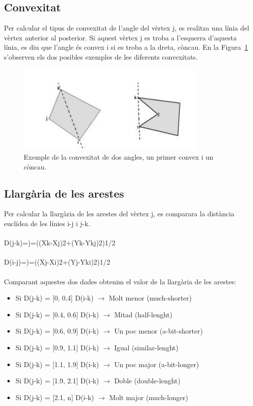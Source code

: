 \documentclass{article}
\begin{document}
\subsection{Convexitat}
Per calcular el tipus de convexitat de l’angle del vèrtex j, es realitza una línia del vèrtex anterior al posterior.
Si aquest vèrtex j es troba a l'esquerra d'aquesta línia, es diu que l'angle és convex i si es troba a la dreta, còncau.
En la Figura~\ref{fig:convex} s'observen els dos posibles exemples de les diferents convexitats.

\begin{figure}[h]
\centering
\includegraphics[width=260pt]{images/convex.jpeg}
\caption {Exemple de la convexitat de dos angles, un primer convex i un còncau.}
\label {fig:convex}
\end{figure}

\subsection{Llargària de les arestes}
Per calcular la llargària de les arestes del vèrtex  j, es comparara la distància euclídea de les línies i-j i j-k.
\\
\\
D(j-k)=)=((Xk-Xj)2+(Yk-Ykj)2)1/2
\\
\\
D(i-j)=)=((Xj-Xi)2+(Yj-Yki)2)1/2
\\
\\
Comparant aquestes dos dades obtenim el valor de la llargària de les arestes:
\begin{itemize}
\item Si D(j-k) = [0, 0,4]   D(i-k) $\rightarrow$  Molt menor (much-shorter)
\item Si D(j-k) = [0.4, 0.6] D(i-k) $\rightarrow$  Mitad (half-lenght)
\item Si D(j-k) = [0.6, 0.9] D(i-k) $\rightarrow$  Un poc menor (a-bit-shorter)
\item Si D(j-k) = [0.9, 1.1] D(i-k) $\rightarrow$  Igual (similar-lenght)
\item Si D(j-k) = [1.1, 1.9] D(i-k) $\rightarrow$  Un poc major (a-bit-longer)
\item Si D(j-k) = [1.9, 2.1] D(i-k) $\rightarrow$  Doble (double-lenght)
\item Si D(j-k) = [2.1, n]   D(i-k) $\rightarrow$  Molt major (much-longer)
\end{itemize}
\end{document}
